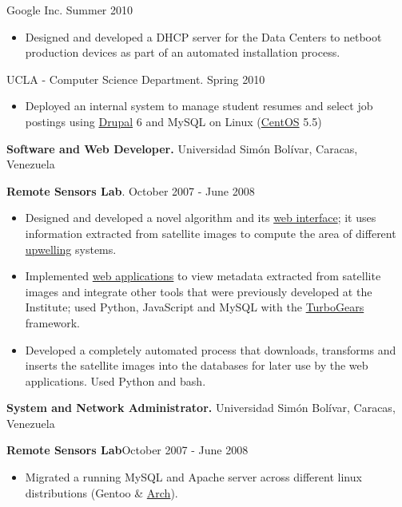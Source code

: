 \documentclass[10pt]{article}
\newcommand{\vitem}{\vspace*{-.4pc}\item}
\begin{document}
 Google Inc. \hfill Summer 2010
\begin{itemize}
  \vitem Designed and developed a DHCP server for the Data Centers to
  netboot production devices as part of an automated installation
  process.
\end{itemize}

 UCLA - Computer Science
Department. \hfill Spring 2010
\begin{itemize}
  \vitem Deployed an internal system to manage student resumes and select job postings using \href{http://drupal.org/}{Drupal} 6 and MySQL on Linux (\href{http://www.centos.org/}{CentOS} 5.5)
\end{itemize}


\flushleft\textbf{Software and Web Developer.} Universidad Simón Bolívar, Caracas, Venezuela

\textbf{Remote Sensors Lab}. \hfill October 2007 - June 2008
\begin{itemize}
  \vitem Designed and developed a novel algorithm and its
  \href{http://ood.cbm.usb.ve/surgencia/sst_modis/mostrar_imagen?img=66}{web
    interface}; it uses information extracted from satellite images to
  compute the area of different
  \href{http://en.wikipedia.org/wiki/Upwelling}{upwelling} systems.

  \vitem Implemented
  \href{http://ood.intecmar.usb.ve/surgencia/sst_modis/}{web
    applications} to view metadata extracted from satellite images and
  integrate other tools that were previously developed at the
  Institute; used Python, JavaScript and MySQL with the
  \href{http://turbogears.org/}{TurboGears} framework.

\vitem Developed a completely automated process that
  downloads, transforms and inserts the satellite images into the
  databases for later use by the web applications. Used Python and bash.
\end{itemize}

\textbf{System and Network Administrator.} Universidad Simón Bolívar, Caracas, Venezuela

\textbf{Remote Sensors Lab}\hfill October 2007 - June 2008
\begin{itemize}
\vitem Migrated a running MySQL and Apache server across different
  linux distributions (Gentoo \& \href{http://www.archlinux.org/}{Arch}).
\end{itemize}
\end{document}
